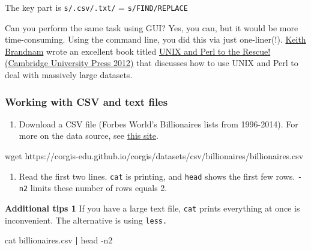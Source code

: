 \documentclass[
]{book}
\newenvironment{Shaded}{\begin{snugshade}}{\end{snugshade}}
\newcommand{\AttributeTok}[1]{\textcolor[rgb]{0.77,0.63,0.00}{#1}}
\newcommand{\FunctionTok}[1]{\textcolor[rgb]{0.00,0.00,0.00}{#1}}
\newcommand{\KeywordTok}[1]{\textcolor[rgb]{0.13,0.29,0.53}{\textbf{#1}}}
\newcommand{\NormalTok}[1]{#1}
\providecommand{\tightlist}{%
  \setlength{\itemsep}{0pt}\setlength{\parskip}{0pt}}
\begin{document}
The key part is \texttt{s/.csv/.txt/} = \texttt{s/FIND/REPLACE}

Can you perform the same task using GUI? Yes, you can, but it would be more time-consuming. Using the command line, you did this via just one-liner(!). \href{http://korflab.ucdavis.edu/Bios/bio_keithb.html}{Keith Brandnam} wrote an excellent book titled \href{https://www.amazon.com/Unix-Perl-Rescue-Keith-Bradnam/dp/0521169828}{UNIX and Perl to the Rescue! (Cambridge University Press 2012)} that discusses how to use UNIX and Perl to deal with massively large datasets.

\hypertarget{working-with-csv-and-text-files}{%
\subsubsection{Working with CSV and text files}\label{working-with-csv-and-text-files}}

\begin{enumerate}
\def\labelenumi{\arabic{enumi}.}
\tightlist
\item
  Download a CSV file (Forbes World's Billionaires lists from 1996-2014). For more on the data source, see \href{https://corgis-edu.github.io/corgis/csv/billionaires/}{this site}.
\end{enumerate}

\begin{Shaded}
\begin{Highlighting}[]
\FunctionTok{wget}\NormalTok{ https://corgis{-}edu.github.io/corgis/datasets/csv/billionaires/billionaires.csv}
\end{Highlighting}
\end{Shaded}

\begin{enumerate}
\def\labelenumi{\arabic{enumi}.}
\setcounter{enumi}{1}
\tightlist
\item
  Read the first two lines. \texttt{cat} is printing, and \texttt{head} shows the first few rows. \texttt{-n2} limits these number of rows equals 2.
\end{enumerate}

\textbf{Additional tips 1}
If you have a large text file, \texttt{cat} prints everything at once is inconvenient. The alternative is using \texttt{less.}

\begin{Shaded}
\begin{Highlighting}[]
\FunctionTok{cat}\NormalTok{ billionaires.csv }\KeywordTok{|} \FunctionTok{head} \AttributeTok{{-}n2}
\end{Highlighting}
\end{Shaded}
\end{document}
